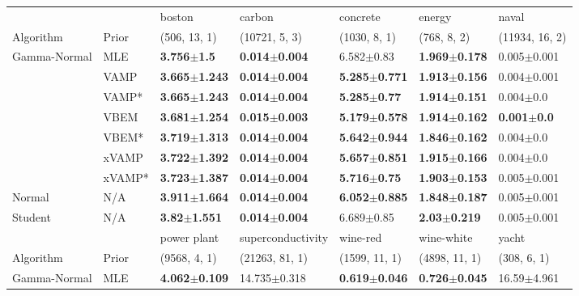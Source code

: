 \begin{tabular}{lllllll}
\toprule
        &     &                    boston &                    carbon &                  concrete &                    energy &                   naval \\
Algorithm & Prior& (506, 13, 1)& (10721, 5, 3)& (1030, 8, 1)& (768, 8, 2)& (11934, 16, 2)\\
\midrule
Gamma-Normal & MLE &    \textbf{3.756$\pm$1.5} &  \textbf{0.014$\pm$0.004} &            6.582$\pm$0.83 &  \textbf{1.969$\pm$0.178} &         0.005$\pm$0.001 \\
        & VAMP &  \textbf{3.665$\pm$1.243} &  \textbf{0.014$\pm$0.004} &  \textbf{5.285$\pm$0.771} &  \textbf{1.913$\pm$0.156} &         0.004$\pm$0.001 \\
        & VAMP* &  \textbf{3.665$\pm$1.243} &  \textbf{0.014$\pm$0.004} &   \textbf{5.285$\pm$0.77} &  \textbf{1.914$\pm$0.151} &           0.004$\pm$0.0 \\
        & VBEM &  \textbf{3.681$\pm$1.254} &  \textbf{0.015$\pm$0.003} &  \textbf{5.179$\pm$0.578} &  \textbf{1.914$\pm$0.162} &  \textbf{0.001$\pm$0.0} \\
        & VBEM* &  \textbf{3.719$\pm$1.313} &  \textbf{0.014$\pm$0.004} &  \textbf{5.642$\pm$0.944} &  \textbf{1.846$\pm$0.162} &           0.004$\pm$0.0 \\
        & xVAMP &  \textbf{3.722$\pm$1.392} &  \textbf{0.014$\pm$0.004} &  \textbf{5.657$\pm$0.851} &  \textbf{1.915$\pm$0.166} &           0.004$\pm$0.0 \\
        & xVAMP* &  \textbf{3.723$\pm$1.387} &  \textbf{0.014$\pm$0.004} &   \textbf{5.716$\pm$0.75} &  \textbf{1.903$\pm$0.153} &         0.005$\pm$0.001 \\
Normal & N/A &  \textbf{3.911$\pm$1.664} &  \textbf{0.014$\pm$0.004} &  \textbf{6.052$\pm$0.885} &  \textbf{1.848$\pm$0.187} &         0.005$\pm$0.001 \\
Student & N/A &   \textbf{3.82$\pm$1.551} &  \textbf{0.014$\pm$0.004} &            6.689$\pm$0.85 &   \textbf{2.03$\pm$0.219} &         0.005$\pm$0.001 \\
\midrule
        &     &               power plant &          superconductivity &                  wine-red &                wine-white &                     yacht \\
Algorithm & Prior& (9568, 4, 1)& (21263, 81, 1)& (1599, 11, 1)& (4898, 11, 1)& (308, 6, 1)\\
\midrule
Gamma-Normal & MLE &  \textbf{4.062$\pm$0.109} &           14.735$\pm$0.318 &  \textbf{0.619$\pm$0.046} &  \textbf{0.726$\pm$0.045} &           16.59$\pm$4.961 \\

\end{tabular}
